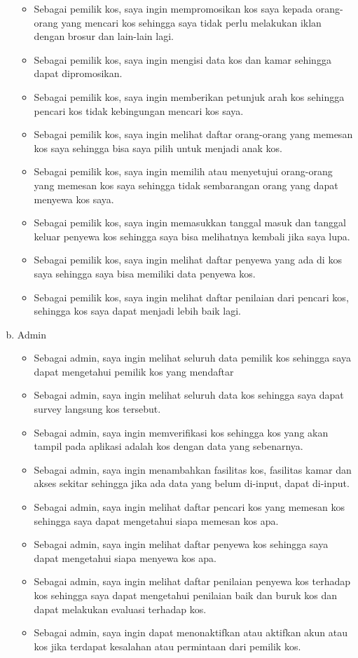 \begin{enumerate}[a.]
			\begin{itemize}
				\item Sebagai pemilik kos, saya ingin mempromosikan kos saya kepada orang-orang yang mencari kos sehingga saya tidak perlu melakukan iklan dengan brosur dan lain-lain lagi.
				\item Sebagai pemilik kos, saya ingin mengisi data kos dan kamar sehingga dapat dipromosikan.
				\item Sebagai pemilik kos, saya ingin memberikan petunjuk arah kos sehingga pencari kos tidak kebingungan mencari kos saya.
				\item Sebagai pemilik kos, saya ingin melihat daftar orang-orang yang memesan kos saya sehingga bisa saya pilih untuk menjadi anak kos.
				\item Sebagai pemilik kos, saya ingin memilih atau menyetujui orang-orang yang memesan kos saya sehingga tidak sembarangan orang yang dapat menyewa kos saya.
				\item Sebagai pemilik kos, saya ingin memasukkan tanggal masuk dan tanggal keluar penyewa kos sehingga saya bisa melihatnya kembali jika saya lupa.
				\item Sebagai pemilik kos, saya ingin melihat daftar penyewa yang ada di kos saya sehingga saya bisa memiliki data penyewa kos.
				\item Sebagai pemilik kos, saya ingin melihat daftar penilaian dari pencari kos, sehingga kos saya dapat menjadi lebih baik lagi.
			\end{itemize}
		
		\item Admin
		\begin{itemize}
			\item Sebagai admin, saya ingin melihat seluruh data pemilik kos sehingga saya dapat mengetahui pemilik kos yang mendaftar
			\item Sebagai admin, saya ingin melihat seluruh data kos sehingga saya dapat survey langsung kos tersebut.
			\item Sebagai admin, saya ingin memverifikasi kos sehingga kos yang akan tampil pada aplikasi adalah kos dengan data yang sebenarnya.
			\item Sebagai admin, saya ingin menambahkan fasilitas kos, fasilitas kamar dan akses sekitar sehingga jika ada data yang belum di-input, dapat di-input.
			\item Sebagai admin, saya ingin melihat daftar pencari kos yang memesan kos sehingga saya dapat mengetahui siapa memesan kos apa.
			\item Sebagai admin, saya ingin melihat daftar penyewa kos sehingga saya dapat mengetahui siapa menyewa kos apa.
			\item Sebagai admin, saya ingin melihat daftar penilaian penyewa kos terhadap kos sehingga saya dapat mengetahui penilaian baik dan buruk kos dan dapat melakukan evaluasi terhadap kos.
			\item Sebagai admin, saya ingin dapat menonaktifkan atau aktifkan akun atau kos jika terdapat kesalahan atau permintaan dari pemilik kos.
		\end{itemize}
			
		\end{enumerate}
